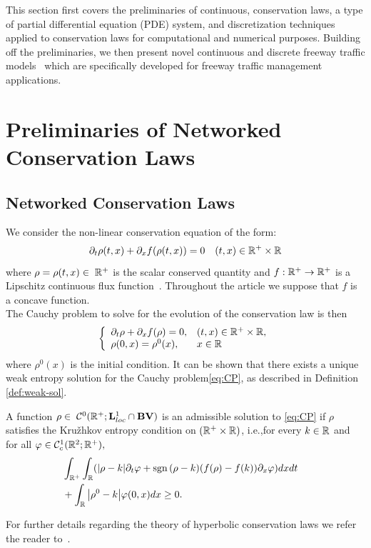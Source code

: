 This section first covers the preliminaries of continuous, conservation laws, a type of partial differential equation (PDE) system, and discretization techniques applied to conservation laws for computational and numerical purposes. Building off the preliminaries, we then present novel continuous and discrete freeway traffic models~\cite{delle2014pde} which are specifically developed for freeway traffic management applications.

\section{Preliminaries of Networked Conservation Laws}
\label{sec:preliminaries}

\subsection{Networked Conservation Laws}

We consider the non-linear conservation equation of the form:
\begin{equation}
\partial_t\rho\left(t,x\right)+\partial_x f\left(\rho\left(t,x\right)\right)=0 \quad (t,x) \in \R^+ \times \R\label{eq:cons}
\end{equation}
where $\rho=\rho(t,x) \in \; \mathbb{R}^+$ is the scalar conserved quantity and $f:\mathbb{R}^+\rightarrow \mathbb{R}^+$ is a Lipschitz continuous flux function~\cite{MR1816648}. Throughout the article we suppose that $f$ is a concave function. \\
The Cauchy problem to solve for the evolution of the conservation law is then 
\begin{equation}
	\label{eq:CP}
		\left\{
		\begin{array}{ll}
		\partial_t \rho+ \partial_x f(\rho) =0, & (t,x)\in\R^+\times \R,\\
		\rho(0,x)=\rho^0(x), & x \in \R\\
		\end{array}
		\right.
\end{equation}
where $\rho^0(x)$ is the initial condition.
It can be shown that there exists a unique weak entropy solution for the Cauchy problem\eqref{eq:CP},  as described in Definition \ref{def:weak-sol}. 
\begin{defn}\label{def:weak-sol}
A function $\rho \in \; \mathcal{C}^0(\mathbb{R}^+; \mathbf{L}^1_{loc}\cap \mathbf{BV})$ is an admissible solution to \eqref{eq:CP} if $\rho$ satisfies the Kru\v{z}hkov entropy condition \cite{Kruzhkov} on $(\mathbb{R}^+\times\mathbb{R})$, i.e.,for every $k\in \mathbb{R}$ and for all $\varphi \in \mathcal{C}^1_c(\mathbb{R}^2;\mathbb{R}^+),$
\begin{eqnarray}
\label{eq:kruzhkov}
	&\int_{\R^+}\int_{\R}(\modulo{\rho -k}  \partial_t \varphi + \sgn{(\rho-k }) (f(\rho)-f(k))\partial_x\varphi)dxdt& \nonumber\\
	 &+\int_{\R}\modulo{\rho^0-k}\varphi(0,x)dx\geq 0.&
\end{eqnarray} 
\end{defn}
For further details regarding the theory of hyperbolic conservation laws we refer the reader to~\cite{garavello2006traffic,Evans1998}.

